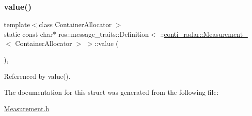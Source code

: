 \subsubsection{\texorpdfstring{value()}{value()}\hspace{0.1cm}{\footnotesize\ttfamily [2/2]}}
{\footnotesize\ttfamily template$<$class Container\+Allocator $>$ \\
static const char$\ast$ ros\+::message\+\_\+traits\+::\+Definition$<$ \+::\hyperlink{structconti__radar_1_1Measurement__}{conti\+\_\+radar\+::\+Measurement\+\_\+}$<$ Container\+Allocator $>$ $>$\+::value (\begin{DoxyParamCaption}\item[{const \+::\hyperlink{structconti__radar_1_1Measurement__}{conti\+\_\+radar\+::\+Measurement\+\_\+}$<$ Container\+Allocator $>$ \&}]{ }\end{DoxyParamCaption})\hspace{0.3cm}{\ttfamily [inline]}, {\ttfamily [static]}}



Referenced by value().



The documentation for this struct was generated from the following file\+:\begin{DoxyCompactItemize}
\item 
\hyperlink{Measurement_8h}{Measurement.\+h}\end{DoxyCompactItemize}
